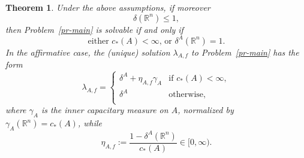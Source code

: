 \documentclass[12pt,a4paper,reqno]{amsart} %
\theoremstyle{lause}
\theoremstyle{maaritelma}
\theoremstyle{lause}
\newtheorem{theorem}{Theorem}[section]
\theoremstyle{maaritelma}
\numberwithin{equation}{section}
\begin{document}
\begin{theorem}\label{th3'}Under the above assumptions, if moreover
\begin{equation}\label{leq1}
 \delta(\mathbb R^n)\leqslant1,
\end{equation}
then Problem~{\rm\ref{pr-main}} is solvable if and only if
\begin{equation}\label{bal1}
\text{either \ $c_*(A)<\infty$, \ or \ $\delta^A(\mathbb R^n)=1$.}
\end{equation}
In the affirmative case, the {\rm(}unique{\rm)} solution $\lambda_{A,f}$ to Problem~{\rm\ref{pr-main}} has the form
\begin{equation}\label{RR}\lambda_{A,f}=\left\{
\begin{array}{cl}\delta^A+\eta_{A,f}\gamma_A&\text{if \ $c_*(A)<\infty$},\\
\delta^A&\text{otherwise},\\ \end{array} \right.
\end{equation}
where $\gamma_A$ is the inner capacitary measure on $A$, normalized by $\gamma_A(\mathbb R^n)=c_*(A)$, while
\begin{equation}\label{eqalt}
\eta_{A,f}:=\frac{1-\delta^A(\mathbb R^n)}{c_*(A)}\in[0,\infty).
\end{equation}


\end{theorem}
\end{document}
